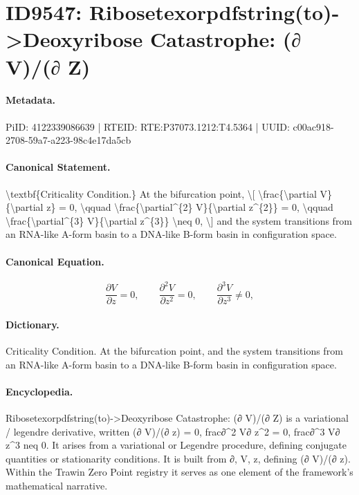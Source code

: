 \section*{ID9547: Ribosetexorpdfstring(to)->Deoxyribose Catastrophe: (∂ V)/(∂ Z)}
\paragraph{Metadata.}
PiID: 4122339086639 | RTEID: RTE:P37073.1212:T4.5364 | UUID: c00ac918-2708-59a7-a223-98c4e17da5cb

\paragraph{Canonical Statement.}
\textbackslash{}textbf\{Criticality Condition.\} At the bifurcation point, \textbackslash{}[ \textbackslash{}frac\{\textbackslash{}partial V\}\{\textbackslash{}partial z\} = 0, \textbackslash{}qquad \textbackslash{}frac\{\textbackslash{}partial\textasciicircum{}\{2\} V\}\{\textbackslash{}partial z\textasciicircum{}\{2\}\} = 0, \textbackslash{}qquad \textbackslash{}frac\{\textbackslash{}partial\textasciicircum{}\{3\} V\}\{\textbackslash{}partial z\textasciicircum{}\{3\}\} \textbackslash{}neq 0, \textbackslash{}] and the system transitions from an RNA-like A-form basin to a DNA-like B-form basin in configuration space.

\paragraph{Canonical Equation.}
\[
\frac{\partial V}{\partial z} = 0, \qquad \frac{\partial^{2} V}{\partial z^{2}} = 0, \qquad \frac{\partial^{3} V}{\partial z^{3}} \neq 0,
\]

\paragraph{Dictionary.}
Criticality Condition. At the bifurcation point, and the system transitions from an RNA-like A-form basin to a DNA-like B-form basin in configuration space.

\paragraph{Encyclopedia.}
Ribosetexorpdfstring(to)->Deoxyribose Catastrophe: (∂ V)/(∂ Z) is a variational / legendre derivative, written (∂ V)/(∂ z) = 0, frac∂\textasciicircum{}2 V∂ z\textasciicircum{}2 = 0, frac∂\textasciicircum{}3 V∂ z\textasciicircum{}3 neq 0. It arises from a variational or Legendre procedure, defining conjugate quantities or stationarity conditions. It is built from ∂, V, z, defining (∂ V)/(∂ z). Within the Trawin Zero Point registry it serves as one element of the framework's mathematical narrative.
